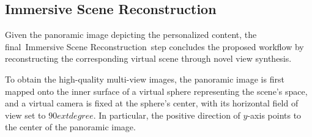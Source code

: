 \documentclass[]{interact}
\newcommand{\stepc}{Immersive Scene Reconstruction}
\begin{document}
\subsection{\stepc}
Given the panoramic image depicting the personalized content, the final~\stepc~step concludes the proposed workflow by reconstructing the corresponding virtual scene through novel view synthesis.

To obtain the high-quality multi-view images, the panoramic image is first mapped onto the inner surface of a virtual sphere representing the scene's space, and a virtual camera is fixed at the sphere's center, with its horizontal field of view set to $90	extdegree$. In particular, the positive direction of $y$-axis points to the center of the panoramic image.

\end{document}
